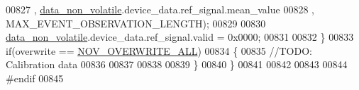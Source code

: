 \begin{DoxyCode}
00827                                                                                                ,
      \hyperlink{a00060_a76ac5f917f5308dcd83de0d7c94559fb}{data\_non\_volatile}.device\_data.ref\_signal.mean\_value
00828                                                                                                ,
      MAX\_EVENT\_OBSERVATION\_LENGTH);
00829 
00830           \hyperlink{a00060_a76ac5f917f5308dcd83de0d7c94559fb}{data\_non\_volatile}.device\_data.ref\_signal.valid = 0x0000;
00831 
00832     \}
00833         \textcolor{keywordflow}{if}(overwrite == \hyperlink{a00029_aa3471d8e4814035dc24211c0890899bb}{NOV\_OVERWRITE\_ALL})
00834         \{
00835             \textcolor{comment}{//TODO: Calibration data}
00836 
00837 
00838 
00839         \}
00840 \}
00841 
00842 
00843 
00844 \textcolor{preprocessor}{#endif}
00845 
\end{DoxyCode}

